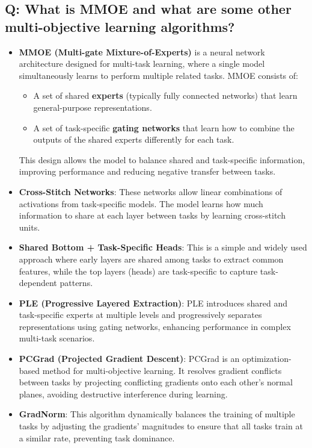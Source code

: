 \documentclass[11pt]{article}
\begin{document}
\subsection*{Q: What is MMOE and what are some other multi-objective learning algorithms?}
\begin{itemize}
	\item \textbf{MMOE (Multi-gate Mixture-of-Experts)} is a neural network architecture designed for multi-task learning, where a single model simultaneously learns to perform multiple related tasks. MMOE consists of:
	      \begin{itemize}
		      \item A set of shared \textbf{experts} (typically fully connected networks) that learn general-purpose representations.
		      \item A set of task-specific \textbf{gating networks} that learn how to combine the outputs of the shared experts differently for each task.
	      \end{itemize}
	      This design allows the model to balance shared and task-specific information, improving performance and reducing negative transfer between tasks.

	\item \textbf{Cross-Stitch Networks}: These networks allow linear combinations of activations from task-specific models. The model learns how much information to share at each layer between tasks by learning cross-stitch units.

	\item \textbf{Shared Bottom + Task-Specific Heads}: This is a simple and widely used approach where early layers are shared among tasks to extract common features, while the top layers (heads) are task-specific to capture task-dependent patterns.

	\item \textbf{PLE (Progressive Layered Extraction)}: PLE introduces shared and task-specific experts at multiple levels and progressively separates representations using gating networks, enhancing performance in complex multi-task scenarios.

	\item \textbf{PCGrad (Projected Gradient Descent)}: PCGrad is an optimization-based method for multi-objective learning. It resolves gradient conflicts between tasks by projecting conflicting gradients onto each other’s normal planes, avoiding destructive interference during learning.

	\item \textbf{GradNorm}: This algorithm dynamically balances the training of multiple tasks by adjusting the gradients' magnitudes to ensure that all tasks train at a similar rate, preventing task dominance.

\end{itemize}
\end{document}
